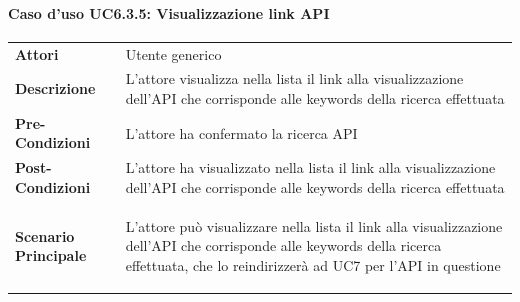 \paragraph{Caso d'uso UC6.3.5: Visualizzazione link API}
\label{UC6_3_5}

\begin{minipage}{\linewidth}
	\begin{tabular}{ l | p{11cm}}
		\hline
		\rowcolor{Gray}
		\multicolumn{2}{c}{UC6.3.5 - Visualizzazione link API} \\
		\hline
		\textbf{Attori} & Utente generico \\
		\textbf{Descrizione} & L'attore visualizza nella lista il link alla visualizzazione dell'API che corrisponde alle keywords della ricerca effettuata \\
		\textbf{Pre-Condizioni} & L'attore ha confermato la ricerca API \\
		\textbf{Post-Condizioni} & L'attore ha visualizzato nella lista il link alla visualizzazione dell'API che corrisponde alle keywords della ricerca effettuata \\
		\textbf{Scenario Principale} & 
		\begin{enumerate*}[label=(\arabic*.),itemjoin={\newline}]
			\item L'attore può visualizzare nella lista il link alla visualizzazione dell'API che corrisponde alle keywords della ricerca effettuata, che lo reindirizzerà ad UC7 per l'API in questione
		\end{enumerate*}\\
	\end{tabular}
\end{minipage}